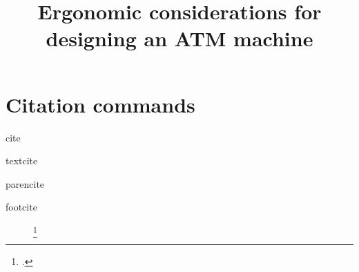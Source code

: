 \documentclass[
  nobib,
  justified,
  english,
  a4paper,
  marginals=raggedright
]{tufte-handout}
\title{\nohyphens{Ergonomic considerations for designing an ATM machine}}
\date{}
\begin{document}
\maketitle

\Blindtext 

\section{Citation commands}

\begin{description}
  \item[cite] 
    \cite{Pheasant2003}
  \item[textcite] 
    \textcite{Pheasant2003}
  \item[parencite] 
    \parencite{Pheasant2003}
  \item[footcite] 
    \footcite{Pheasant2003}
\end{description}

\printbibliography

\end{document}
